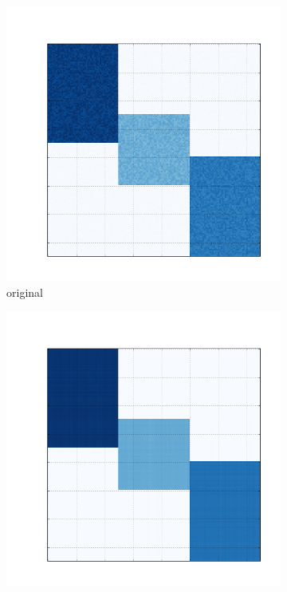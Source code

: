 \documentclass[10pt]{beamer}
\begin{document}
\begin{frame}
\begin{figure}[H]
      \begin{subfigure}[b]{0.2\textwidth}
          \includegraphics[width=\textwidth]{img/e-bic-structure.png}
          \caption*{original}
      \end{subfigure}
      \begin{subfigure}[b]{0.2\textwidth}
          \includegraphics[width=\textwidth]{img/e-reconstruction-2-onmtf.png}

\end{subfigure}
\end{figure}
\end{frame}
\end{document}

